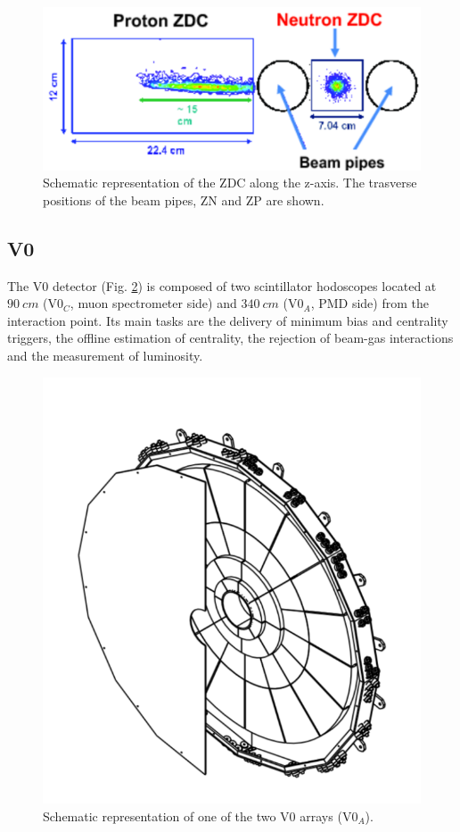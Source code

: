 \begin{figure}[!h]
\begin{center}
\includegraphics[width=.5\linewidth]{Chapters/Introduction/Figs/ZDC.pdf}
\caption{Schematic representation of the ZDC along the z-axis. The trasverse positions of the beam pipes, ZN and ZP are shown.}
\label{fig:ZDC}
\end{center}
\end{figure}

\subsection{V0}
The V0 detector (Fig. \ref{fig:V0}) is composed of two scintillator hodoscopes located at $90\ cm$ (V0$_C$, muon spectrometer side) and $340\ cm$ (V0$_A$, PMD side) from the interaction point. 
Its main tasks are the delivery of minimum bias and centrality triggers, the offline estimation of centrality, the rejection of beam-gas interactions and the measurement of luminosity.

\begin{figure}[!h]
\begin{center}
\includegraphics[width=.7\linewidth]{Chapters/Introduction/Figs/V0.pdf}
\caption{Schematic representation of one of the two V0 arrays (V0$_A$).}
\label{fig:V0}
\end{center}
\end{figure}

